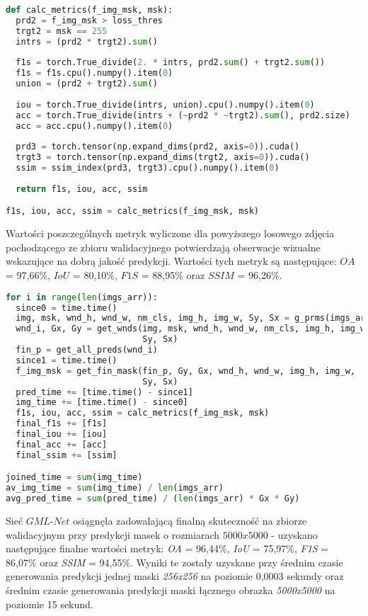 \cell
\begin{lstlisting}[name=Rozdzial3.1, language=Python]
def calc_metrics(f_img_msk, msk):
  prd2 = f_img_msk > loss_thres
  trgt2 = msk == 255
  intrs = (prd2 * trgt2).sum()
  
  f1s = torch.True_divide(2. * intrs, prd2.sum() + trgt2.sum())
  f1s = f1s.cpu().numpy().item(0)
  union = (prd2 + trgt2).sum()
  
  iou = torch.True_divide(intrs, union).cpu().numpy().item(0)
  acc = torch.True_divide(intrs + (~prd2 * ~trgt2).sum(), prd2.size)
  acc = acc.cpu().numpy().item(0)
  
  prd3 = torch.tensor(np.expand_dims(prd2, axis=0)).cuda()
  trgt3 = torch.tensor(np.expand_dims(trgt2, axis=0)).cuda()
  ssim = ssim_index(prd3, trgt3).cpu().numpy().item(0)
  
  return f1s, iou, acc, ssim

f1s, iou, acc, ssim = calc_metrics(f_img_msk, msk)
\end{lstlisting}


\cell
Wartości poszczególnych metryk wyliczone dla powyższego losowego zdjęcia pochodzącego ze zbioru walidacyjnego potwierdzają obserwacje wizualne wskazujące na dobrą jakość predykcji. Wartości tych metryk są następujące: $\textit{OA}$ = 97,66$\%$, $\textit{IoU}$ = 80,10$\%$, $\textit{F1S}$ = 88,95$\%$ oraz $\textit{SSIM}$ = 96,26$\%$.
\vspace{1cm}

\cell
\begin{lstlisting}[name=Rozdzial3.1, language=Python]
for i in range(len(imgs_arr)):
  since0 = time.time()
  img, msk, wnd_h, wnd_w, nm_cls, img_h, img_w, Sy, Sx = g_prms(imgs_arr, i)
  wnd_i, Gx, Gy = get_wnds(img, msk, wnd_h, wnd_w, nm_cls, img_h, img_w, 
                           Sy, Sx)
  fin_p = get_all_preds(wnd_i)
  since1 = time.time()
  f_img_msk = get_fin_mask(fin_p, Gy, Gx, wnd_h, wnd_w, img_h, img_w,
                           Sy, Sx)
  pred_time += [time.time() - since1]
  img_time += [time.time() - since0]
  f1s, iou, acc, ssim = calc_metrics(f_img_msk, msk)                                                        
  final_f1s += [f1s]
  final_iou += [iou]
  final_acc += [acc]
  final_ssim += [ssim]

joined_time = sum(img_time)
av_img_time = sum(img_time) / len(imgs_arr)
avg_pred_time = sum(pred_time) / (len(imgs_arr) * Gx * Gy)
\end{lstlisting}

\cell
Sieć $\textit{GML-Net}$ osiągnęła zadowalającą finalną skuteczność na zbiorze walidacyjnym przy predykcji masek o rozmiarach $\textit{5000x5000}$ - uzyskano następujące finalne wartości metryk: \textit{OA} = 96,44\%, \textit{IoU} = 75,97\%, \textit{F1S} = 86,07\% oraz \textit{SSIM} = 94,55\%. Wyniki te zostały uzyskane przy średnim czasie generowania predykcji jednej maski \emph{256x256} na poziomie 0,0003 sekundy oraz średnim czasie generowania predykcji maski łącznego obrazka \emph{5000x5000} na poziomie 15 sekund.
\vspace{0.5cm}

